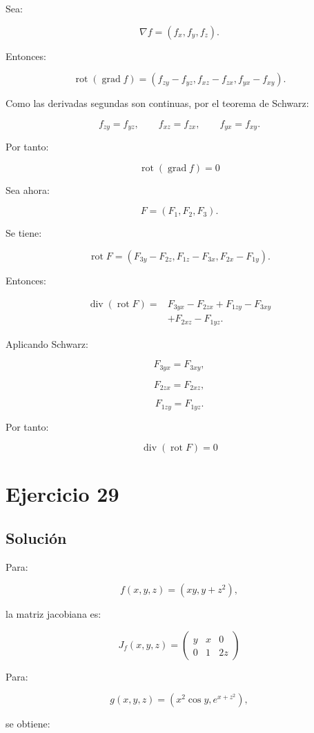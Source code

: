 \documentclass[11pt,a4paper]{article}
\newcommand{\grad}{\operatorname{grad}}
\newcommand{\diver}{\operatorname{div}}
\newcommand{\rot}{\operatorname{rot}}
\begin{document}
Sea:

\[
\nabla f
=
(f_x,f_y,f_z).
\]

Entonces:

\[
\rot(\grad f)
=
\left(
f_{zy}-f_{yz},
f_{xz}-f_{zx},
f_{yx}-f_{xy}
\right).
\]

Como las derivadas segundas son continuas, por el teorema de Schwarz:

\[
f_{zy}=f_{yz},
\qquad
f_{xz}=f_{zx},
\qquad
f_{yx}=f_{xy}.
\]

Por tanto:

\[
\boxed{
\rot(\grad f)=0
}
\]

Sea ahora:

\[
F=(F_1,F_2,F_3).
\]

Se tiene:

\[
\rot F
=
\left(
F_{3y}-F_{2z},
F_{1z}-F_{3x},
F_{2x}-F_{1y}
\right).
\]

Entonces:

\[
\begin{aligned}
\diver(\rot F)
={}&
F_{3yx}-F_{2zx}
+
F_{1zy}-F_{3xy}\\
&+
F_{2xz}-F_{1yz}.
\end{aligned}
\]

Aplicando Schwarz:

\[
F_{3yx}=F_{3xy},
\]

\[
F_{2zx}=F_{2xz},
\]

\[
F_{1zy}=F_{1yz}.
\]

Por tanto:

\[
\boxed{
\diver(\rot F)=0
}
\]

\section{Ejercicio 29}
\subsection{Solución}

Para:

\[
f(x,y,z)
=
(xy,y+z^2),
\]

la matriz jacobiana es:

\[
\boxed{
J_f(x,y,z)
=
\begin{pmatrix}
y&x&0\\
0&1&2z
\end{pmatrix}
}
\]

Para:

\[
g(x,y,z)
=
\left(
x^2\cos y,
e^{x+z^2}
\right),
\]

se obtiene:
\end{document}
